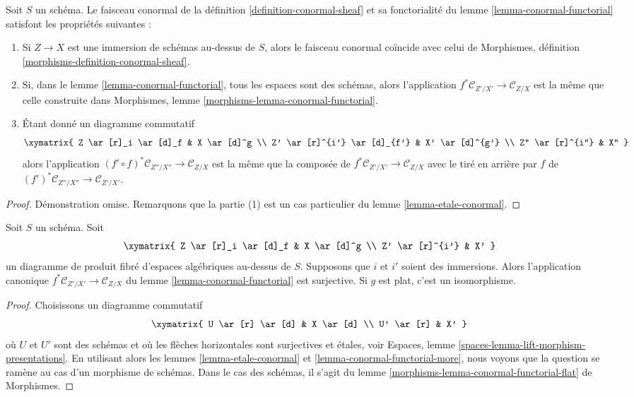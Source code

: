 \begin{lemma}
\label{lemma-conormal-functorial-more}
Soit $S$ un schéma. Le faisceau conormal de la
définition \ref{definition-conormal-sheaf} et sa fonctorialité du
lemme \ref{lemma-conormal-functorial}
satisfont les propriétés suivantes :
\begin{enumerate}
\item Si $Z \to X$ est une immersion de schémas au-dessus de $S$, alors le faisceau conormal
coïncide avec celui de
Morphismes, définition \ref{morphisms-definition-conormal-sheaf}.
\item Si, dans le
lemme \ref{lemma-conormal-functorial},
tous les espaces sont des schémas, alors l'application
$f^*\mathcal{C}_{Z'/X'} \to \mathcal{C}_{Z/X}$ est la même
que celle construite dans
Morphismes, lemme \ref{morphisms-lemma-conormal-functorial}.
\item Étant donné un diagramme commutatif
$$
\xymatrix{
Z \ar[r]_i \ar[d]_f & X \ar[d]^g \\
Z' \ar[r]^{i'} \ar[d]_{f'} & X' \ar[d]^{g'} \\
Z'' \ar[r]^{i''} & X''
}
$$
alors l'application $(f' \circ f)^*\mathcal{C}_{Z''/X''} \to \mathcal{C}_{Z/X}$
est la même que la composée de
$f^*\mathcal{C}_{Z'/X'} \to \mathcal{C}_{Z/X}$
avec le tiré en arrière par $f$ de
$(f')^*\mathcal{C}_{Z''/X''} \to \mathcal{C}_{Z'/X'}$.
\end{enumerate}
\end{lemma}

\begin{proof}
Démonstration omise. Remarquons que la partie (1) est un cas particulier du
lemme \ref{lemma-etale-conormal}.
\end{proof}

\begin{lemma}
\label{lemma-conormal-functorial-flat}
Soit $S$ un schéma. Soit
$$
\xymatrix{
Z \ar[r]_i \ar[d]_f & X \ar[d]^g \\
Z' \ar[r]^{i'} & X'
}
$$
un diagramme de produit fibré d'espaces algébriques au-dessus de $S$. Supposons que
$i$ et $i'$ soient des immersions. Alors l'application canonique
$f^*\mathcal{C}_{Z'/X'} \to \mathcal{C}_{Z/X}$ du
lemme \ref{lemma-conormal-functorial}
est surjective. Si $g$ est plat, c'est un isomorphisme.
\end{lemma}

\begin{proof}
Choisissons un diagramme commutatif
$$
\xymatrix{
U \ar[r] \ar[d] & X \ar[d] \\
U' \ar[r] & X'
}
$$
où $U$ et $U'$ sont des schémas et où les flèches horizontales sont surjectives
et \'etales, voir
Espaces, lemme \ref{spaces-lemma-lift-morphism-presentations}.
En utilisant alors
les lemmes \ref{lemma-etale-conormal} et \ref{lemma-conormal-functorial-more},
nous voyons que la question se ramène au cas d'un morphisme de schémas.
Dans le cas des schémas, il s'agit du
lemme \ref{morphisms-lemma-conormal-functorial-flat} de Morphismes.
\end{proof}

